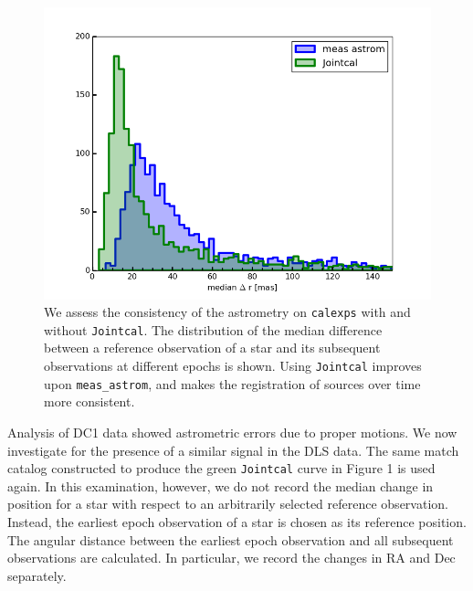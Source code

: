 \documentclass[modern]{aastex61}
\begin{document}
\begin{figure}
   \includegraphics[width=.9\textwidth]{jc_vs_measastrom.png}
	\caption{We assess the consistency of the astrometry on {\tt\string calexps} with and without {\tt\string Jointcal}. The distribution of the median difference between a reference observation of a star and its subsequent observations at different epochs is shown. Using {\tt\string Jointcal} improves upon {\tt\string meas\_astrom}, and makes the registration of sources over time more consistent.}
\end{figure}

Analysis of DC1 data showed astrometric errors due to proper motions. We now investigate for the presence of a similar signal in the DLS data. The same match catalog constructed to produce the green {\tt\string Jointcal} curve in Figure 1 is used again. In this examination, however, we do not record the median change in position for a star with respect to an arbitrarily selected reference observation. Instead, the earliest epoch observation of a star is chosen as its reference position. The angular distance between the earliest epoch observation and all subsequent observations are calculated. In particular, we record the changes in RA and Dec separately. 
\end{document}
